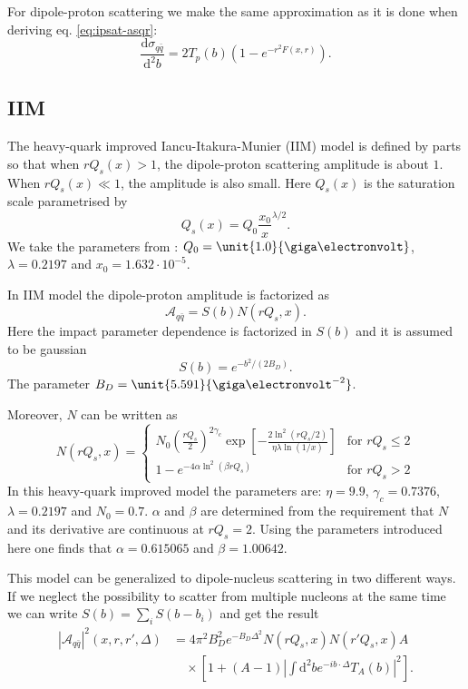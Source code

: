 \documentclass[a4paper,12pt]{article}
\newcommand{\der}{\mathrm{d}}
\newcommand{\A}{\mathcal{A}}
\begin{document}
For dipole-proton scattering we make the same approximation as it is done when deriving eq. \eqref{eq:ipsat-asqr}:
\begin{equation}
	\frac{\der \sigma_{q\bar q}}{\der^2 b} = 2 T_p(b)\left( 1-e^{-r^2F(x,r) } \right).
\end{equation}

\subsection{IIM}
The heavy-quark improved Iancu-Itakura-Munier (IIM) model is defined by parts so that when $rQ_s(x)>1$, the dipole-proton scattering amplitude is about $1$. When $rQ_s(x) \ll 1$, the amplitude is also small. Here $Q_s(x)$ is the saturation scale parametrised by
\begin{equation}
	Q_s(x) = Q_0 \frac{x_0}{x}^{\lambda/2}.
\end{equation}
We take the parameters from \cite{Marquet:2007nf}: $Q_0 = \unit{1.0}{\giga\electronvolt}$, $\lambda = 0.2197$ and $x_0 = 1.632 \cdot 10^{-5}$.

In IIM model the dipole-proton amplitude is factorized as
\begin{equation}
	\label{eq:iim-a}
	\A_{q\bar q} = S(b) N(rQ_s,x).
\end{equation}
Here the impact parameter dependence is factorized in $S(b)$ and it is assumed to be gaussian
\begin{equation}
	S(b) = e^{-b^2/(2B_D)}.
\end{equation}
The parameter $B_D = \unit{5.591}{\giga\electronvolt^{-2}}$.

Moreover, $N$ can be written as
\begin{equation}
N(rQ_s,x) = \begin{cases}
	N_0\left( \frac{rQ_s}{2} \right)^{2\gamma_c} \exp \left[ -\frac{2 \ln^2 (rQ_s/2) }{\eta \lambda \ln (1/x)} \right] & \text{for } rQ_s \leq 2  \\
	1-e^{-4\alpha \ln^2 (\beta rQ_s)} & \text{for } rQ_s > 2	
	\end{cases}
\end{equation}
In this heavy-quark improved model the parameters are: $\eta = 9.9$, $\gamma_c = 0.7376$, $\lambda=0.2197$ and $N_0 = 0.7$. $\alpha$ and $\beta$ are determined from the requirement that $N$ and its derivative are continuous at $rQ_s=2$. Using the parameters introduced here one finds that $\alpha = 0.615065$ and $\beta = 1.00642$.

This model can be generalized to dipole-nucleus scattering in two different ways. If we neglect the possibility to scatter from multiple nucleons at the same time we can write $S(b) = \sum_i S(b-b_i)$ and get the result
\begin{equation}
\begin{split}
	|\A_{q\bar q}|^2(x,r,r',\Delta) &= 4\pi^2B_D^2 e^{-B_D \Delta^2} N(rQ_s,x)N(r'Q_s,x) A \\
	&\quad \times \left[1 + (A-1) \left| \int \der^2 b e^{-ib \cdot \Delta} T_A(b) \right|^2 \right] . 
\end{split}
\end{equation}
\end{document}
